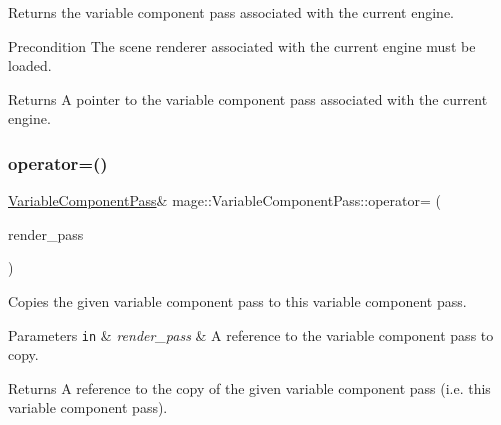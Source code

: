 Returns the variable component pass associated with the current engine.

\begin{DoxyPrecond}{Precondition}
The scene renderer associated with the current engine must be loaded. 
\end{DoxyPrecond}
\begin{DoxyReturn}{Returns}
A pointer to the variable component pass associated with the current engine. 
\end{DoxyReturn}
\hypertarget{classmage_1_1_variable_component_pass_a9df39d8323fea2b411a4f84abe8bac3c}{}\label{classmage_1_1_variable_component_pass_a9df39d8323fea2b411a4f84abe8bac3c} 
\subsubsection{\texorpdfstring{operator=()}{operator=()}\hspace{0.1cm}{\footnotesize\ttfamily [1/2]}}
{\footnotesize\ttfamily \hyperlink{classmage_1_1_variable_component_pass}{Variable\+Component\+Pass}\& mage\+::\+Variable\+Component\+Pass\+::operator= (\begin{DoxyParamCaption}\item[{const \hyperlink{classmage_1_1_variable_component_pass}{Variable\+Component\+Pass} \&}]{render\+\_\+pass }\end{DoxyParamCaption})\hspace{0.3cm}{\ttfamily [delete]}}

Copies the given variable component pass to this variable component pass.


\begin{DoxyParams}[1]{Parameters}
\mbox{\tt in}  & {\em render\+\_\+pass} & A reference to the variable component pass to copy. \\
\hline
\end{DoxyParams}
\begin{DoxyReturn}{Returns}
A reference to the copy of the given variable component pass (i.\+e. this variable component pass). 
\end{DoxyReturn}
\hypertarget{classmage_1_1_variable_component_pass_ab4c2ccc632031ec51c16f7c9d500e427}{}\label{classmage_1_1_variable_component_pass_ab4c2ccc632031ec51c16f7c9d500e427} 
